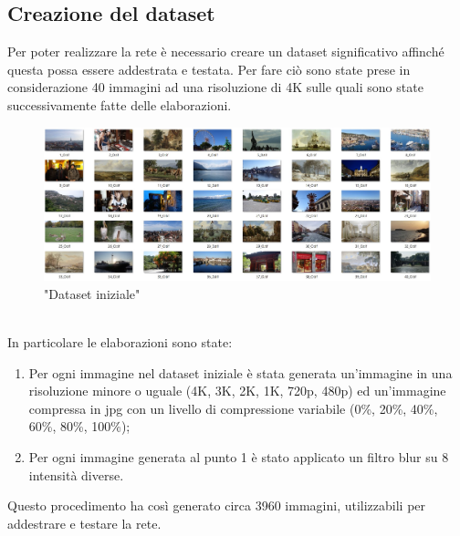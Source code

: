\documentclass[a4paper,11pt]{article}
\begin{document}
    \subsection{Creazione del dataset}
    Per poter realizzare la rete è necessario creare un dataset significativo affinché questa possa essere addestrata e testata. 
    Per fare ciò sono state prese in considerazione 40 immagini ad una risoluzione di 4K sulle quali sono state successivamente fatte delle elaborazioni.
    \begin{figure}[h]
        \centering
        \includegraphics[scale=0.365]{dataset}
        \caption{"Dataset iniziale"}
    \end{figure}
    \\In particolare le elaborazioni sono state:
    \begin{enumerate}
        \item Per ogni immagine nel dataset iniziale è stata generata un'immagine in una risoluzione minore o uguale (4K, 3K, 2K, 1K, 720p, 480p) ed un'immagine compressa in jpg con un livello di compressione variabile (0\%, 20\%, 40\%, 60\%, 80\%, 100\%);
        \item Per ogni immagine generata al punto 1 è stato applicato un filtro blur su 8 intensità diverse.
    \end{enumerate}
    Questo procedimento ha così generato circa 3960 immagini, utilizzabili per addestrare e testare la rete.
    
\end{document}
